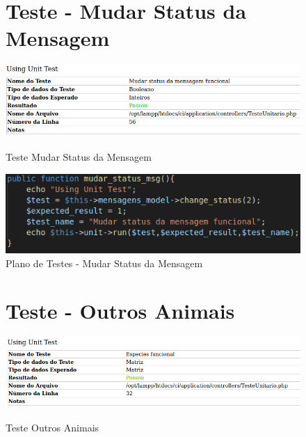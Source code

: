 \begin{apendicesenv}
\begin{figure}[!htbp]
\begin{flushleft}
    \section{Teste - Mudar Status da Mensagem}
\end{flushleft}
    \centering
    \caption{Teste Mudar Status da Mensagem}
    \includegraphics[width=1\textwidth,pagecommand=\chapter{}]{imagens/teste_msg.png}
    \label{teste-mensagem}
\end{figure}

\begin{figure}[htb]
    \centering
    \caption{\label{fig_timeline}Plano de Testes - Mudar Status da Mensagem}
	\includegraphics[width=1\textwidth]{imagens/cod_teste_mudar_status.png}
\end{figure}

\begin{figure}[!htbp]
\begin{flushleft}
    \section{Teste - Outros Animais}
\end{flushleft}
    \centering
    \caption{Teste Outros Animais}
    \includegraphics[width=1\textwidth,pagecommand=\chapter{}]{imagens/teste_especie.png}
    \label{teste-outros-animais}
\end{figure}


\end{apendicesenv}
